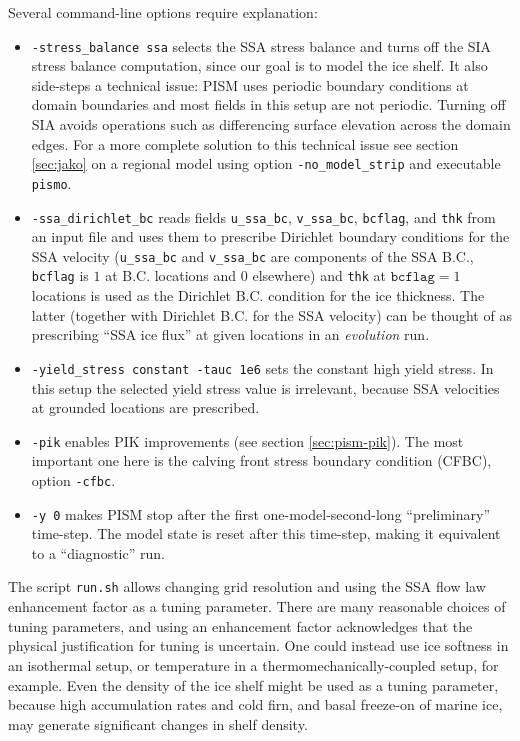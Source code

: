 \noindent Several command-line options require explanation:
\begin{itemize}
\item \texttt{-stress_balance ssa} selects the SSA stress balance and
  turns off the SIA stress balance computation, since our goal is to
  model the ice shelf. It also side-steps a technical issue: PISM uses
  periodic boundary conditions at domain boundaries and most fields in
  this setup are not periodic. Turning off SIA avoids operations such
  as differencing surface elevation across the domain edges. For a
  more complete solution to this technical issue see section
  \ref{sec:jako} on a regional model using option
  \verb|-no_model_strip| and executable \verb|pismo|.
\item \texttt{-ssa_dirichlet_bc} reads fields \texttt{u_ssa_bc}, \texttt{v_ssa_bc}, \texttt{bcflag}, and \texttt{thk} from an input file and uses them to prescribe Dirichlet boundary conditions for the SSA velocity (\texttt{u_ssa_bc} and \texttt{v_ssa_bc} are components of the SSA B.C., \texttt{bcflag} is $1$ at B.C. locations and $0$ elsewhere) and \texttt{thk} at $\mathtt{bcflag} = 1$ locations is used as the Dirichlet B.C. condition for the ice thickness. The latter (together with Dirichlet B.C. for the SSA velocity) can be thought of as prescribing ``SSA ice flux'' at given locations in an \emph{evolution} run.
\item \texttt{-yield_stress constant -tauc 1e6} sets the constant high yield stress. In this setup the selected yield stress value is irrelevant, because SSA velocities at grounded locations are prescribed.
\item \texttt{-pik} enables PIK improvements (see section \ref{sec:pism-pik}). The most important one here is the calving front stress boundary condition (CFBC), option \verb|-cfbc|.
\item \texttt{-y 0} makes PISM stop after the first one-model-second-long ``preliminary'' time-step.  The model state is reset after this time-step, making it equivalent to a ``diagnostic'' run.
\end{itemize}

The script \texttt{run.sh} allows changing grid resolution and using the SSA flow law enhancement factor as a tuning parameter.  There are many reasonable choices of tuning parameters, and using an enhancement factor acknowledges that the physical justification for tuning is uncertain.  One could instead use ice softness in an isothermal setup, or temperature in a thermomechanically-coupled setup, for example.  Even the density of the ice shelf might be used as a tuning parameter, because high accumulation rates and cold firn, and basal freeze-on of marine ice, may generate significant changes in shelf density.

